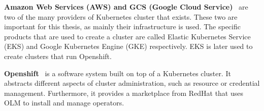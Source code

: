 \textbf{Amazon Web Services (AWS) and GCS (Google Cloud Service)}~\cite{eks,gke} are two of the many providers of Kubernetes cluster that exists.
These two are important for this thesis, as mainly their infrastructure is used.
The specific products that are used to create a cluster are called Elastic Kubernetes Service (EKS) and Google Kubernetes Engine (GKE) respectively.
EKS is later used to create clusters that run Openshift.

\textbf{Openshift}~\cite{openshift} is a software system built on top of a Kubernetes cluster.
It abstracts different aspects of cluster administration, such as resource or credential management.
Furthermore, it provides a marketplace from RedHat that uses OLM to install and manage operators.
